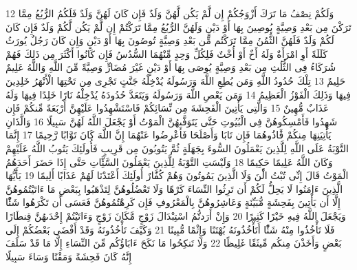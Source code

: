 \documentclass[20pt,a4paper]{article}
\begin{document}
{\tiny\colorbox{cl_aya}{12}} وَلَكُمْ نِصْفُ مَا تَرَكَ أَزْوَجُكُمْ إِن لَّمْ يَكُن لَّهُنَّ وَلَدٌ فَإِن كَانَ لَهُنَّ وَلَدٌ فَلَكُمُ الرُّبُعُ مِمَّا تَرَكْنَ مِن بَعْدِ وَصِيَّةٍ يُوصِينَ بِهَا أَوْ دَيْنٍ وَلَهُنَّ الرُّبُعُ مِمَّا تَرَكْتُمْ إِن لَّمْ يَكُن لَّكُمْ وَلَدٌ فَإِن كَانَ لَكُمْ وَلَدٌ فَلَهُنَّ الثُّمُنُ مِمَّا تَرَكْتُم مِّن بَعْدِ وَصِيَّةٍ تُوصُونَ بِهَا أَوْ دَيْنٍ وَإِن كَانَ رَجُلٌ يُورَثُ كَلَلَةً أَوِ امْرَأَةٌ وَلَهُ أَخٌ أَوْ أُخْتٌ فَلِكُلِّ وَحِدٍ مِّنْهُمَا السُّدُسُ فَإِن كَانُوا أَكْثَرَ مِن ذَلِكَ فَهُمْ شُرَكَاءُ فِى الثُّلُثِ مِن بَعْدِ وَصِيَّةٍ يُوصَى بِهَا أَوْ دَيْنٍ غَيْرَ مُضَارٍّ وَصِيَّةً مِّنَ اللَّهِ وَاللَّهُ عَلِيمٌ حَلِيمٌ
{\tiny\colorbox{cl_aya}{13}} تِلْكَ حُدُودُ اللَّهِ وَمَن يُطِعِ اللَّهَ وَرَسُولَهُ يُدْخِلْهُ جَنَّتٍ تَجْرِى مِن تَحْتِهَا الْأَنْهَرُ خَلِدِينَ فِيهَا وَذَلِكَ الْفَوْزُ الْعَظِيمُ
{\tiny\colorbox{cl_aya}{14}} وَمَن يَعْصِ اللَّهَ وَرَسُولَهُ وَيَتَعَدَّ حُدُودَهُ يُدْخِلْهُ نَارًا خَلِدًا فِيهَا وَلَهُ عَذَابٌ مُّهِينٌ
{\tiny\colorbox{cl_aya}{15}} وَالَّتِى يَأْتِينَ الْفَحِشَةَ مِن نِّسَائِكُمْ فَاسْتَشْهِدُوا عَلَيْهِنَّ أَرْبَعَةً مِّنكُمْ فَإِن شَهِدُوا فَأَمْسِكُوهُنَّ فِى الْبُيُوتِ حَتَّى يَتَوَفَّىهُنَّ الْمَوْتُ أَوْ يَجْعَلَ اللَّهُ لَهُنَّ سَبِيلًا
{\tiny\colorbox{cl_aya}{16}} وَالَّذَانِ يَأْتِيَنِهَا مِنكُمْ فََٔاذُوهُمَا فَإِن تَابَا وَأَصْلَحَا فَأَعْرِضُوا عَنْهُمَا إِنَّ اللَّهَ كَانَ تَوَّابًا رَّحِيمًا
{\tiny\colorbox{cl_aya}{17}} إِنَّمَا التَّوْبَةُ عَلَى اللَّهِ لِلَّذِينَ يَعْمَلُونَ السُّوءَ بِجَهَلَةٍ ثُمَّ يَتُوبُونَ مِن قَرِيبٍ فَأُولَئِكَ يَتُوبُ اللَّهُ عَلَيْهِمْ وَكَانَ اللَّهُ عَلِيمًا حَكِيمًا
{\tiny\colorbox{cl_aya}{18}} وَلَيْسَتِ التَّوْبَةُ لِلَّذِينَ يَعْمَلُونَ السَّئَِّاتِ حَتَّى إِذَا حَضَرَ أَحَدَهُمُ الْمَوْتُ قَالَ إِنِّى تُبْتُ الَْٔنَ وَلَا الَّذِينَ يَمُوتُونَ وَهُمْ كُفَّارٌ أُولَئِكَ أَعْتَدْنَا لَهُمْ عَذَابًا أَلِيمًا
{\tiny\colorbox{cl_aya}{19}} يَأَيُّهَا الَّذِينَ ءَامَنُوا لَا يَحِلُّ لَكُمْ أَن تَرِثُوا النِّسَاءَ كَرْهًا وَلَا تَعْضُلُوهُنَّ لِتَذْهَبُوا بِبَعْضِ مَا ءَاتَيْتُمُوهُنَّ إِلَّا أَن يَأْتِينَ بِفَحِشَةٍ مُّبَيِّنَةٍ وَعَاشِرُوهُنَّ بِالْمَعْرُوفِ فَإِن كَرِهْتُمُوهُنَّ فَعَسَى أَن تَكْرَهُوا شَئًْا وَيَجْعَلَ اللَّهُ فِيهِ خَيْرًا كَثِيرًا
{\tiny\colorbox{cl_aya}{20}} وَإِنْ أَرَدتُّمُ اسْتِبْدَالَ زَوْجٍ مَّكَانَ زَوْجٍ وَءَاتَيْتُمْ إِحْدَىهُنَّ قِنطَارًا فَلَا تَأْخُذُوا مِنْهُ شَئًْا أَتَأْخُذُونَهُ بُهْتَنًا وَإِثْمًا مُّبِينًا
{\tiny\colorbox{cl_aya}{21}} وَكَيْفَ تَأْخُذُونَهُ وَقَدْ أَفْضَى بَعْضُكُمْ إِلَى بَعْضٍ وَأَخَذْنَ مِنكُم مِّيثَقًا غَلِيظًا
{\tiny\colorbox{cl_aya}{22}} وَلَا تَنكِحُوا مَا نَكَحَ ءَابَاؤُكُم مِّنَ النِّسَاءِ إِلَّا مَا قَدْ سَلَفَ إِنَّهُ كَانَ فَحِشَةً وَمَقْتًا وَسَاءَ سَبِيلًا
\end{document}
